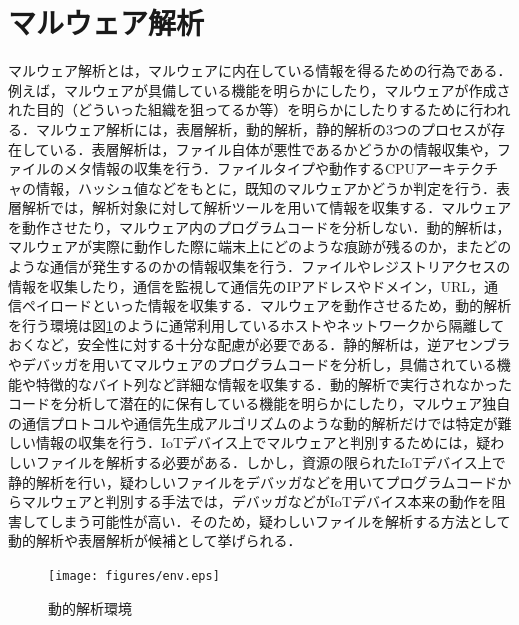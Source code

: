 \section{マルウェア解析}

マルウェア解析とは，マルウェアに内在している情報を得るための行為である．例えば，マルウェアが具備している機能を明らかにしたり，マルウェアが作成された目的（どういった組織を狙ってるか等）を明らかにしたりするために行われる\cite{実践}．マルウェア解析には，表層解析，動的解析，静的解析の3つのプロセスが存在している．表層解析は，ファイル自体が悪性であるかどうかの情報収集や，ファイルのメタ情報の収集を行う．ファイルタイプや動作するCPUアーキテクチャの情報，ハッシュ値などをもとに，既知のマルウェアかどうか判定を行う．表層解析では，解析対象に対して解析ツールを用いて情報を収集する．マルウェアを動作させたり，マルウェア内のプログラムコードを分析しない．動的解析は，マルウェアが実際に動作した際に端末上にどのような痕跡が残るのか，またどのような通信が発生するのかの情報収集を行う．ファイルやレジストリアクセスの情報を収集したり，通信を監視して通信先のIPアドレスやドメイン，URL，通信ペイロードといった情報を収集する．マルウェアを動作させるため，動的解析を行う環境は図\ref{fig:env}のように通常利用しているホストやネットワークから隔離しておくなど，安全性に対する十分な配慮が必要である．静的解析は，逆アセンブラやデバッガを用いてマルウェアのプログラムコードを分析し，具備されている機能や特徴的なバイト列など詳細な情報を収集する．動的解析で実行されなかったコードを分析して潜在的に保有している機能を明らかにしたり，マルウェア独自の通信プロトコルや通信先生成アルゴリズムのような動的解析だけでは特定が難しい情報の収集を行う．IoTデバイス上でマルウェアと判別するためには，疑わしいファイルを解析する必要がある．しかし，資源の限られたIoTデバイス上で静的解析を行い，疑わしいファイルをデバッガなどを用いてプログラムコードからマルウェアと判別する手法では，デバッガなどがIoTデバイス本来の動作を阻害してしまう可能性が高い．そのため，疑わしいファイルを解析する方法として動的解析や表層解析が候補として挙げられる．

\newpage

\begin{figure}[h]
   \centering
      \texttt{[image: figures/env.eps]}
      \caption{動的解析環境}
   \label{fig:env}   
\end{figure}

